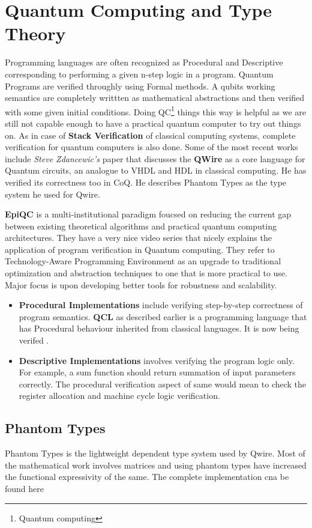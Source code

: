 \chapter{Quantum Computing and Type Theory }
Programming languages are often recognized as Procedural and Descriptive corresponding to performing a given n-step logic in a program. Quantum Programs are verified throughly using Formal methods. A qubits working semantics are completely writtten as mathematical abstractions and then verified with some given initial conditions. Doing QC\footnote{Quantum computing} things this way is helpful as we are still not capable enough to have a practical quantum computer to try out things on. As in case of \textbf{Stack Verification} of classical computing systems, complete verification for quantum computers is also done. Some of the most recent works include \textit{Steve Zdancewic's} paper\cite{qwire} that discusses the \textbf{QWire} as a core language for Quantum circuits, an analogue to VHDL and HDL in classical computing. He has verified its correctness too in CoQ\cite{COQ}. He describes Phantom Types as the type system he used for Qwire.

\textbf{EpiQC}\cite{epiqc} is a multi-institutional paradigm foucsed on reducing the current gap between existing theoretical algorithms and practical quantum computing architectures. They have a very nice video series\cite{epiqc_video} that nicely explains the application of program verification in Quantum computing. They refer to Technology-Aware Programming Environment as an upgrade to traditional optimization and abstraction techniques to one that is more practical to use. Major focus is upon developing better tools for robustness and scalability.


\begin{itemize}
\item{
	\textbf{Procedural Implementations} include verifying step-by-step correctness of program semantics. \textbf{QCL} as described earlier is a programming language that has Procedural behaviour inherited from classical languages. It is now being verifed .   
}
\item{
	\textbf{Descriptive Implementations} involves verifying the program logic only. For example, a sum function should return summation of input parameters correctly. The procedural verification aspect of same would mean to check the register allocation and machine cycle logic verification. 
}
\end{itemize}

\section{Phantom Types}
Phantom Types \cite{phantom_types} is the  lightweight dependent type system used by Qwire. Most of the mathematical work involves matrices and using phantom types have increased the functional expressivity of the same. The complete implementation cna be found here 
